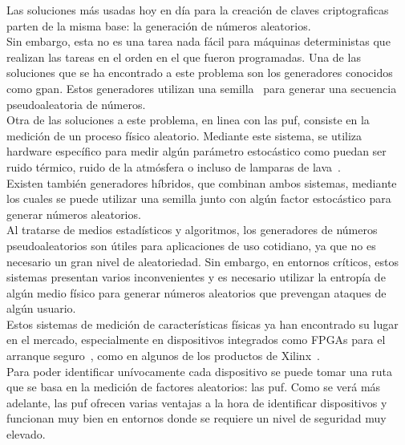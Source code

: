 \documentclass[spanish]{template/minim}
\begin{document}
Las soluciones más usadas hoy en día para la creación de claves criptograficas parten de la misma base: la generación de números {\color{accent}aleatorios}.\\

Sin embargo, esta no es una tarea nada fácil para máquinas deterministas que realizan las tareas en el orden en el que fueron programadas. Una de las soluciones que se ha encontrado a este problema son los generadores conocidos como \gls{gpan}. Estos generadores utilizan una {\color{accent}semilla}~ para generar una secuencia pseudoaleatoria de números.\\

Otra de las soluciones a este problema, en linea con las \gls{puf}, consiste en la medición de un proceso {\color{accent}físico} aleatorio. Mediante este sistema, se utiliza hardware específico para medir algún parámetro estocástico como puedan ser ruido térmico, ruido de la atmósfera o incluso de lamparas de lava~\cite{lavarand}.\\

Existen también generadores híbridos, que combinan ambos sistemas, mediante los cuales se puede utilizar una semilla junto con algún factor estocástico para generar números aleatorios.\\

Al tratarse de medios estadísticos y algoritmos, los generadores de números pseudoaleatorios son útiles para aplicaciones de uso cotidiano, ya que no es necesario un gran nivel de aleatoriedad. Sin embargo, en entornos críticos, estos sistemas presentan varios inconvenientes y es necesario utilizar la entropía de algún medio físico para generar números aleatorios que prevengan ataques de algún usuario.\\

Estos sistemas de medición de características físicas ya han encontrado su lugar en el mercado, especialmente en dispositivos integrados como FPGAs para el arranque seguro~, como en algunos de los productos de Xilinx~\cite{zynq}.\\

Para poder identificar unívocamente cada dispositivo se puede tomar una ruta que se basa en la medición de factores aleatorios: las \gls{puf}. Como se verá más adelante, las \gls{puf} ofrecen varias ventajas a la hora de identificar dispositivos y funcionan muy bien en entornos donde se requiere un nivel de seguridad muy elevado.\\
\end{document}
